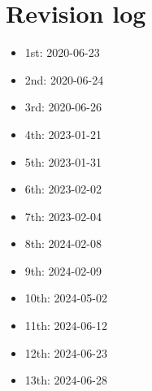 \documentclass[10pt]{article}
\begin{document}
	\section{Revision log}
	\begin{itemize}
		\item 1st: 2020-06-23
		\item 2nd: 2020-06-24
		\item 3rd: 2020-06-26
		\item 4th: 2023-01-21
		\item 5th: 2023-01-31
		\item 6th: 2023-02-02
		\item 7th: 2023-02-04
		\item 8th: 2024-02-08
		\item 9th: 2024-02-09
		\item 10th: 2024-05-02
		\item 11th: 2024-06-12
		\item 12th: 2024-06-23
		\item 13th: 2024-06-28
	\end{itemize}
	
	
\end{document}
